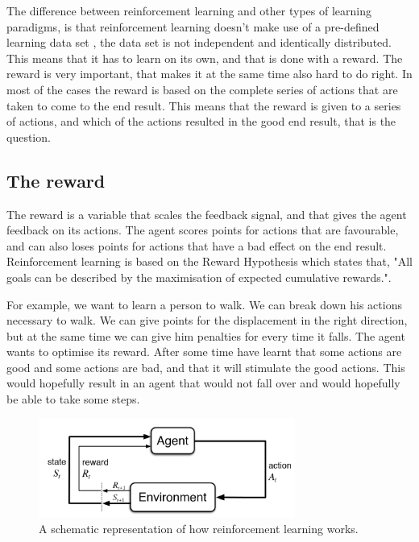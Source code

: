 \documentclass{report}
\begin{document}

The difference between reinforcement learning and other types of learning paradigms, is that reinforcement learning doesn't make use of a pre-defined learning data set \cite[2]{Sutton2018}, the data set is not independent and identically distributed. This means that it has to learn on its own, and that is done with a reward. The reward is very important, that makes it at the same time also hard to do right. In most of the cases the reward is based on the complete series of actions that are taken to come to the end result. This means that the reward is given to a series of actions, and which of the actions resulted in the good end result, that is the question.

\subsection{The reward}
The reward is a variable that scales the feedback signal, and that gives the agent feedback on its actions. The agent scores points for actions that are favourable, and can also loses points for actions that have a bad effect on the end result. Reinforcement learning is based on the Reward Hypothesis which states that, "All goals can be described by the maximisation of expected cumulative rewards."\cite{RL_intro}.

For example, we want to learn a person to walk. We can break down his actions necessary to walk. We can give points for the displacement in the right direction, but at the same time we can give him penalties for every time it falls. The agent wants to optimise its reward. After some time have learnt that some actions are good and some actions are bad, and that it will stimulate the good actions. This would hopefully result in an agent that would not fall over and would hopefully be able to take some steps.

\begin{figure}
    \centering
    \includegraphics[width=0.75\textwidth]{verslag/images/reinforcement_learning_diagram.png}
    \caption{A schematic representation of how reinforcement learning works.\cite{RLimg}}
    \label{fig:reinforcement_diagram}
\end{figure}
\end{document}
